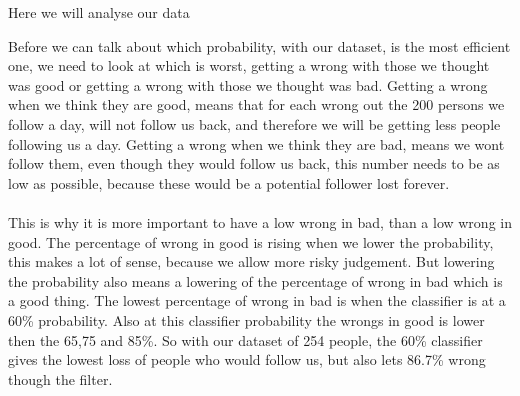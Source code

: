 Here we will analyse our data

Before we can talk about which probability, with our dataset, is the most efficient one, we need to look at which is worst, getting a wrong with those we thought was good or getting a wrong with those we thought was bad. Getting a wrong when we think they are good, means that for each wrong out the 200 persons we follow a day, will not follow us back, and therefore we will be getting less people following us a day. Getting a wrong when we think they are bad, means we wont follow them, even though they would follow us back, this number needs to be as low as possible, because these would be a potential follower lost forever.\\
\\
This is why it is more important to have a low wrong in bad, than a low wrong in good. The percentage of wrong in good is rising when we lower the probability, this makes a lot of sense, because we allow more risky judgement. But lowering the probability also means a lowering of the percentage of wrong in bad which is a good thing. The lowest percentage of wrong in bad is when the classifier is at a 60\% probability. Also at this classifier probability the wrongs in good is lower then the  65,75 and 85\%. So with our dataset of 254 people, the 60\% classifier gives the lowest loss of people who would follow us, but also lets 86.7\% wrong though the filter.